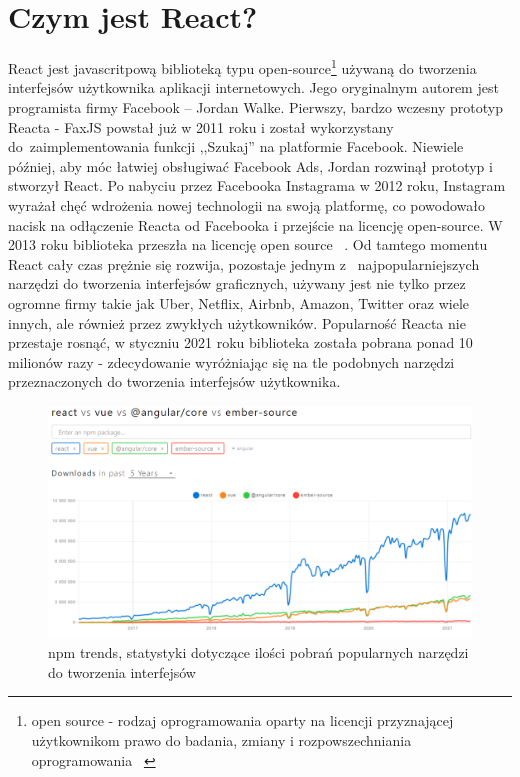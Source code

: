 \documentclass[oneside,polski,logo,indent]{amuthesis}
\begin{document}
\section{Czym jest React?}
{
React jest javascritpową biblioteką typu open-source\footnote{open source - rodzaj oprogramowania oparty na licencji przyznającej użytkownikom prawo do badania, zmiany i rozpowszechniania oprogramowania ~\cite{opensourcewiki}} używaną do tworzenia interfejsów użytkownika aplikacji internetowych. Jego oryginalnym autorem jest programista firmy Facebook -- Jordan Walke. Pierwszy, bardzo wczesny prototyp Reacta - FaxJS powstał już w 2011 roku i został wykorzystany do~zaimplementowania funkcji ,,Szukaj'' na platformie Facebook. Niewiele później, aby móc łatwiej obsługiwać Facebook Ads, Jordan rozwinął prototyp i stworzył React. Po nabyciu przez Facebooka Instagrama w 2012 roku, Instagram wyrażał chęć wdrożenia nowej technologii na swoją platformę, co powodowało nacisk na odłączenie Reacta od Facebooka i przejście na licencję open-source. W 2013 roku biblioteka przeszła na licencję open source ~\cite{reactstory}. 
Od tamtego momentu React cały czas prężnie się rozwija, pozostaje jednym z~ najpopularniejszych narzędzi do tworzenia interfejsów graficznych, używany jest nie tylko przez ogromne firmy takie jak Uber, Netflix, Airbnb, Amazon, Twitter oraz wiele innych, ale również przez zwykłych użytkowników. Popularność Reacta nie przestaje rosnąć, w styczniu 2021 roku biblioteka została pobrana ponad 10 milionów razy - zdecydowanie wyróżniając się na tle podobnych narzędzi przeznaczonych do tworzenia interfejsów użytkownika.
\begin{figure}
\centering
\includegraphics[width=13cm]{statystyki react vue angular.png}
\caption{npm trends, statystyki dotyczące ilości pobrań popularnych narzędzi do tworzenia interfejsów}
\label{statystyki react vue angular.png}
\end{figure}
}
\end{document}
